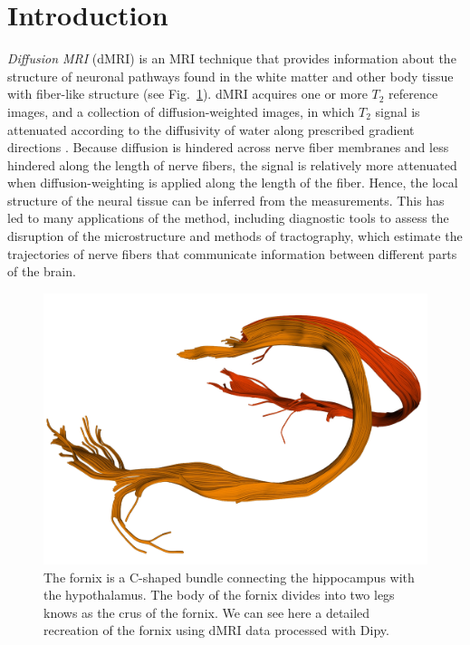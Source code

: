 \documentclass{bioinfo}
\begin{document}
\section{Introduction}

\emph{Diffusion MRI} (dMRI) \citep{merboldt-hanicke-etal:85,
  lebihan-breton:85, taylor-bushell:85}
is an MRI technique \citep{callaghan:91} that provides information
about the structure of neuronal pathways found in the white matter and
other body tissue with fiber-like structure (see Fig.~\ref{Fig:fornix}). dMRI acquires one or more
$T_{2}$ reference images, and a collection of diffusion-weighted images, in which $T_{2}$ signal is attenuated according
to the diffusivity of water along prescribed gradient directions
\citep{behrens-johansen-berg:09, jones:10}. Because diffusion is hindered
across nerve fiber membranes and less hindered along the length of nerve fibers, the
signal is relatively more attenuated when diffusion-weighting is applied along
the length of the fiber. Hence, the local structure of the neural tissue can be
inferred from the measurements. This has led to many applications of the method,
including diagnostic tools to assess the disruption of the microstructure and
methods of tractography, which estimate the trajectories of nerve fibers that
communicate information between different parts of the brain.

\begin{figure}
\includegraphics[scale=0.55]{Figures/fornix.jpg}
\centering{}
\caption{The fornix is a C-shaped bundle connecting the hippocampus with the
 hypothalamus. The body of the fornix divides into two legs knows as the crus
 of the fornix. We can see here a detailed recreation of the fornix using dMRI
 data processed with Dipy. \label{Fig:fornix}}
\end{figure}
\end{document}
